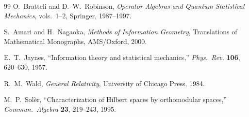 \documentclass[11pt,a4paper,openany]{book}
\theoremstyle{remark}
\begin{document}
\begin{thebibliography}{99}
O.~Bratteli and D.~W.~Robinson,
\emph{Operator Algebras and Quantum Statistical Mechanics},
vols.~1--2, Springer, 1987--1997.

S.~Amari and H.~Nagaoka,
\emph{Methods of Information Geometry},
Translations of Mathematical Monographs, AMS/Oxford, 2000.

E.~T.~Jaynes,
``Information theory and statistical mechanics,''
\emph{Phys.\ Rev.} \textbf{106}, 620--630, 1957.

R.~M.~Wald,
\emph{General Relativity},
University of Chicago Press, 1984.

M.~P.~Sol\`er,
``Characterization of Hilbert spaces by orthomodular spaces,''
\emph{Commun.\ Algebra} \textbf{23}, 219--243, 1995.

\end{thebibliography}
\end{document}
